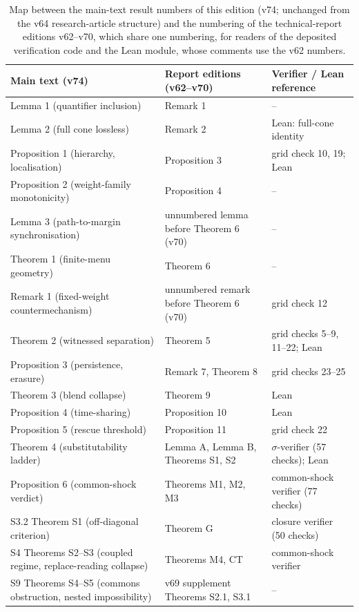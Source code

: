 \documentclass[preprint,11pt,authoryear]{elsarticle}
\theoremstyle{remark}
\begin{document}
\begin{table}[!htbp]
\centering\small
\caption{Map between the main-text result numbers of this edition (v74; unchanged from the v64 research-article structure) and the numbering of the technical-report editions v62--v70, which share one numbering, for readers of the deposited verification code and the Lean module, whose comments use the v62 numbers.}
\begin{tabularx}{\textwidth}{@{}>{\raggedright\arraybackslash}p{}>{\raggedright\arraybackslash}p{}X@{}}
\toprule
Main text (v74) & Report editions (v62--v70) & Verifier / Lean reference \\
\midrule
Lemma 1 (quantifier inclusion) & Remark 1 & -- \\
Lemma 2 (full cone lossless) & Remark 2 & Lean: full-cone identity \\
Proposition 1 (hierarchy, localisation) & Proposition 3 & grid check 10, 19; Lean \\
Proposition 2 (weight-family monotonicity) & Proposition 4 & -- \\
Lemma 3 (path-to-margin synchronisation) & unnumbered lemma before Theorem 6 (v70) & -- \\
Theorem 1 (finite-menu geometry) & Theorem 6 & -- \\
Remark 1 (fixed-weight countermechanism) & unnumbered remark before Theorem 6 (v70) & grid check 12 \\
Theorem 2 (witnessed separation) & Theorem 5 & grid checks 5--9, 11--22; Lean \\
Proposition 3 (persistence, erasure) & Remark 7, Theorem 8 & grid checks 23--25 \\
Theorem 3 (blend collapse) & Theorem 9 & Lean \\
Proposition 4 (time-sharing) & Proposition 10 & Lean \\
Proposition 5 (rescue threshold) & Proposition 11 & grid check 22 \\
Theorem 4 (substitutability ladder) & Lemma A, Lemma B, Theorems S1, S2 & $\sigma$-verifier (57 checks); Lean \\
Proposition 6 (common-shock verdict) & Theorems M1, M2, M3 & common-shock verifier (77 checks) \\
S3.2 Theorem S1 (off-diagonal criterion) & Theorem G & closure verifier (50 checks) \\
S4 Theorems S2--S3 (coupled regime, replace-reading collapse) & Theorems M4, CT & common-shock verifier \\
S9 Theorems S4--S5 (commons obstruction, nested impossibility) & v69 supplement Theorems S2.1, S3.1 & -- \\
\bottomrule
\end{tabularx}
\end{table}
\end{document}
